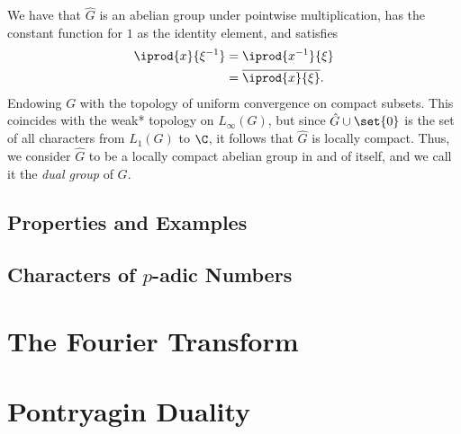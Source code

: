 \documentclass[10pt]{mypackage}
\begin{document}
We have that $\hat{G}$ is an abelian group under pointwise multiplication, has the constant function for $1$ as the identity element, and satisfies
\begin{align*}
  \iprod{x}{\xi^{-1}} &= \iprod{x^{-1}}{\xi}\\
                      &= \overline{ \iprod{x}{\xi} }.
\end{align*}
Endowing $G$ with the topology of uniform convergence on compact subsets. This coincides with the weak* topology on $L_{\infty}(G)$, but since $\hat{G}\cup \set{0}$ is the set of all characters from $L_1(G)$ to $\C$, it follows that $\hat{G}$ is locally compact. Thus, we consider $\hat{G}$ to be a locally compact abelian group in and of itself, and we call it the \textit{dual group} of $G$.
\subsection{Properties and Examples}%

\subsection{Characters of $p$-adic Numbers}%

\section{The Fourier Transform}%
\section{Pontryagin Duality}%
\nocite{folland_abstract_harmonic_analysis}
\printbibliography
\end{document}
